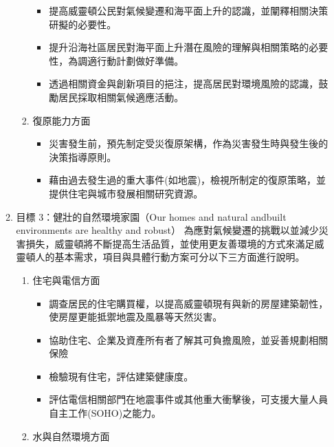\documentclass[a4paper,12pt]{article}
\begin{document}
\begin{enumerate}
\begin{enumerate}
\begin{enumerate}
\label{sec:orge48f9c9}
\begin{itemize}
\item 提高威靈頓公民對氣候變遷和海平面上升的認識，並闡釋相關決策研擬的必要性。\\
\item 提升沿海社區居民對海平面上升潛在風險的理解與相關策略的必要性，為調適行動計劃做好準備。\\
\item 透過相關資金與創新項目的挹注，提高居民對環境風險的認識，鼓勵居民採取相關氣候適應活動。\\
\end{itemize}
\item 復原能力方面
\label{sec:org0039464}
\begin{itemize}
\item 災害發生前，預先制定受災復原架構，作為災害發生時與發生後的決策指導原則。\\
\item 藉由過去發生過的重大事件(如地震)，檢視所制定的復原策略，並提供住宅與城市發展相關研究資源。\\
\end{itemize}
\end{enumerate}
\item 目標 3：健壯的自然環境家園（Our homes and natural andbuilt environments are healthy and robust）
\label{sec:org51131cc}
為應對氣候變遷的挑戰以並減少災害損失，威靈頓將不斷提高生活品質，並使用更友善環境的方式來滿足威靈頓人的基本需求，項目與具體行動方案可分以下三方面進行說明。\\
\begin{enumerate}
\item 住宅與電信方面
\label{sec:orgb98333a}
\begin{itemize}
\item 調查居民的住宅購買權，以提高威靈頓現有與新的房屋建築韌性，使房屋更能抵禦地震及風暴等天然災害。\\
\item 協助住宅、企業及資產所有者了解其可負擔風險，並妥善規劃相關保險\\
\item 檢驗現有住宅，評估建築健康度。\\
\item 評估電信相關部門在地震事件或其他重大衝擊後，可支援大量人員自主工作(SOHO)之能力。\\
\end{itemize}
\item 水與自然環境方面
\label{sec:org749c8ef}
\begin{itemize}

\end{itemize}
\end{enumerate}
\end{enumerate}
\end{enumerate}
\end{document}
